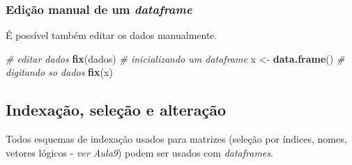 \documentclass[]{book}
\newenvironment{Shaded}{\begin{snugshade}}{\end{snugshade}}
\newcommand{\KeywordTok}[1]{\textcolor[rgb]{0.13,0.29,0.53}{\textbf{#1}}}
\newcommand{\StringTok}[1]{\textcolor[rgb]{0.31,0.60,0.02}{#1}}
\newcommand{\CommentTok}[1]{\textcolor[rgb]{0.56,0.35,0.01}{\textit{#1}}}
\newcommand{\NormalTok}[1]{#1}
\begin{document}
\subsubsection{\texorpdfstring{Edição manual de um
\emph{dataframe}}{Edição manual de um dataframe}}\label{edicao-manual-de-um-dataframe}

É possível também editar os dados manualmente.

\begin{Shaded}
\begin{Highlighting}[]
\CommentTok{# editar dados}
\KeywordTok{fix}\NormalTok{(dados)}
\CommentTok{# inicializando um dataframe}
\NormalTok{x <-}\StringTok{ }\KeywordTok{data.frame}\NormalTok{()}
\CommentTok{# digitando so dados}
\KeywordTok{fix}\NormalTok{(x)}
\end{Highlighting}
\end{Shaded}

\subsection{Indexação, seleção e
alteração}\label{indexacao-selecao-e-alteracao}

Todos esquemas de indexação usados para matrizes (seleção por índices,
nomes, vetores lógicos - \emph{ver Aula9}) podem ser usados com
\emph{dataframes}.
\end{document}

